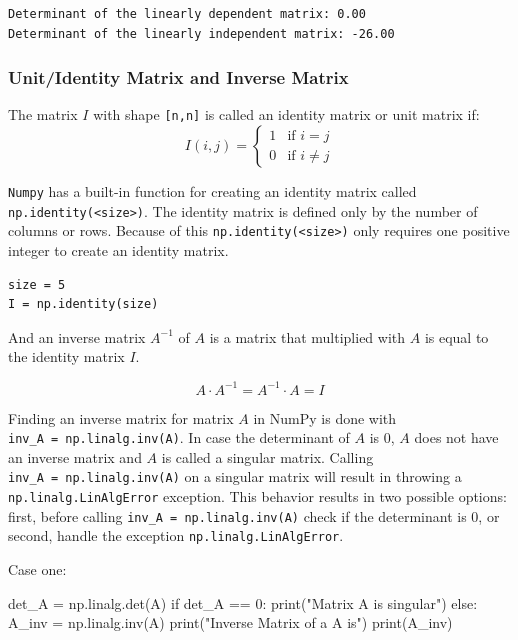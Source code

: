 \documentclass[11pt]{article}
\newenvironment{Shaded}{}{}
\newcommand{\NormalTok}[1]{{#1}}
\begin{document}
    \begin{Verbatim}[commandchars=\\\{\}]
Determinant of the linearly dependent matrix: 0.00
Determinant of the linearly independent matrix: -26.00
    \end{Verbatim}

    \subsubsection{Unit/Identity Matrix and Inverse
Matrix}\label{unitidentity-matrix-and-inverse-matrix}

The matrix \(I\) with shape \texttt{{[}n,n{]}} is called an identity
matrix or unit matrix if: \[
I(i,j) =
\begin{cases}
1 & \text{if } i = j \\
0 & \text{if } i \neq j
\end{cases}
\]

\texttt{Numpy} has a built-in function for creating an identity matrix
called \texttt{np.identity(\textless{}size\textgreater{})}. The identity
matrix is defined only by the number of columns or rows. Because of this
\texttt{np.identity(\textless{}size\textgreater{})} only requires one
positive integer to create an identity matrix.

\begin{verbatim}
size = 5
I = np.identity(size)
\end{verbatim}

And an inverse matrix \(A^{-1}\) of \(A\) is a matrix that multiplied
with \(A\) is equal to the identity matrix \(I\).

\[ A \cdot A^{-1} =  A^{-1} \cdot A = I \]

Finding an inverse matrix for matrix \(A\) in NumPy is done with
\texttt{inv\_A\ =\ np.linalg.inv(A)}. In case the determinant of \(A\)
is \(0\), \(A\) does not have an inverse matrix and \(A\) is called a
singular matrix. Calling \texttt{inv\_A\ =\ np.linalg.inv(A)} on a
singular matrix will result in throwing a \texttt{np.linalg.LinAlgError}
exception. This behavior results in two possible options: first, before
calling \texttt{inv\_A\ =\ np.linalg.inv(A)} check if the determinant is
\(0\), or second, handle the exception \texttt{np.linalg.LinAlgError}.

Case one:

\begin{Shaded}
\begin{Highlighting}[]
\NormalTok{det\_A = np.linalg.det(A)}
\NormalTok{if det\_A == 0:}
\NormalTok{ print("Matrix A is singular")}
\NormalTok{else:}
\NormalTok{ A\_inv = np.linalg.inv(A)}
\NormalTok{ print("Inverse Matrix of a A is")}
\NormalTok{ print(A\_inv)}
\end{Highlighting}
\end{Shaded}
\end{document}
